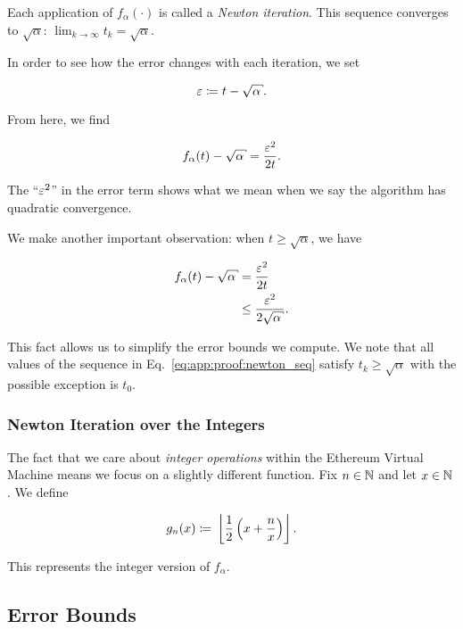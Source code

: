 \noindent
Each application of $f_{\alpha}(\cdot)$ is called a \emph{Newton iteration}.
This sequence converges to $\sqrt{\alpha}$:
$\lim_{k\to\infty} t_{k} = \sqrt{\alpha}$.

In order to see how the error changes with each iteration,
we set

\begin{equation}
    \eps \mathDef{} t - \sqrt{\alpha}.
\end{equation}

\noindent
From here, we find

\begin{equation}
    f_{\alpha}(t) - \sqrt{\alpha} = \frac{\eps^{2}}{2t}.
    \label{eq:app:error_equality}
\end{equation}

\noindent
The ``$\varepsilon^{2}$'' in the error term shows what we mean
when we say the algorithm has quadratic convergence.

We make another important observation:
when $t\ge\sqrt{\alpha}$, we have

\begin{align}
    f_{\alpha}(t) - \sqrt{\alpha} &= \frac{\eps^{2}}{2t} \nonumber\\
        &\le \frac{\eps^{2}}{2\sqrt{\alpha}}.
    \label{eq:app:error_inequality}
\end{align}

\noindent
This fact allows us to simplify the error bounds we compute.
We note that all values of the sequence
in Eq.~\eqref{eq:app:proof:newton_seq}
satisfy $t_{k}\ge\sqrt{\alpha}$
with the possible exception is $t_{0}$.

\subsubsection{Newton Iteration over the Integers}

The fact that we care about \emph{integer operations} within
the Ethereum Virtual Machine means we focus on a slightly different function.
Fix $n\in\mathbb{N}$ and let $x\in\mathbb{N}$.
We define

\begin{equation}
    g_{n}(x) \coloneqq{} \left\lfloor \frac{1}{2}\left( x + \frac{n}{x} \right) \right\rfloor.
\end{equation}

\noindent
This represents the integer version of $f_{\alpha}$.


\subsection{Error Bounds}

